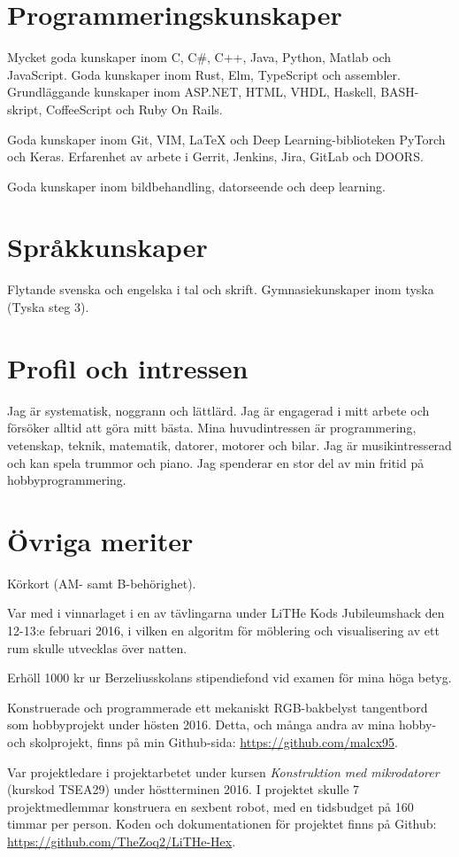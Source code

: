 \documentclass[a4paper,notitlepage]{article}
\begin{document}
\section*{Programmeringskunskaper}
Mycket goda kunskaper inom C, C\#, C++, Java, Python, Matlab och JavaScript.
Goda kunskaper inom Rust, Elm, TypeScript och assembler.
Grundläggande kunskaper inom ASP.NET, HTML, VHDL, Haskell, BASH-skript,
CoffeeScript och Ruby On Rails.

Goda kunskaper inom Git, VIM, LaTeX och Deep Learning-biblioteken PyTorch och
Keras. Erfarenhet av arbete i Gerrit, Jenkins, Jira, GitLab och DOORS.

Goda kunskaper inom bildbehandling, datorseende och deep learning.

\section*{Språkkunskaper}
Flytande svenska och engelska i tal och skrift. Gymnasiekunskaper inom tyska
(Tyska steg 3).

\section*{Profil och intressen}
Jag är systematisk, noggrann och lättlärd. Jag är engagerad i mitt arbete och
försöker alltid att göra mitt bästa. Mina huvudintressen är programmering, vetenskap, 
teknik, matematik, datorer, motorer och bilar. Jag är musikintresserad och kan
spela trummor och piano. Jag spenderar en stor del av min fritid på hobbyprogrammering.

\section*{Övriga meriter}
Körkort (AM- samt B-behörighet).

Var med i vinnarlaget i en av tävlingarna under LiTHe Kods Jubileumshack den
12-13:e februari 2016, i vilken en algoritm för möblering och visualisering av 
ett rum skulle utvecklas över natten.

Erhöll 1000 kr ur Berzeliusskolans stipendiefond vid examen för mina höga
betyg.

Konstruerade och programmerade ett mekaniskt RGB-bakbelyst tangentbord som
hobbyprojekt under hösten 2016. Detta, och många andra av mina hobby- och skolprojekt, finns på min Github-sida: \url{https://github.com/malcx95}.

Var projektledare i projektarbetet under kursen \textit{Konstruktion med
mikrodatorer} (kurskod TSEA29) under höstterminen 2016.
I projektet skulle 7 projektmedlemmar
konstruera en sexbent robot, med en tidsbudget på 160 timmar per person. Koden
och dokumentationen för projektet finns på Github:
\url{https://github.com/TheZoq2/LiTHe-Hex}.
\end{document}
